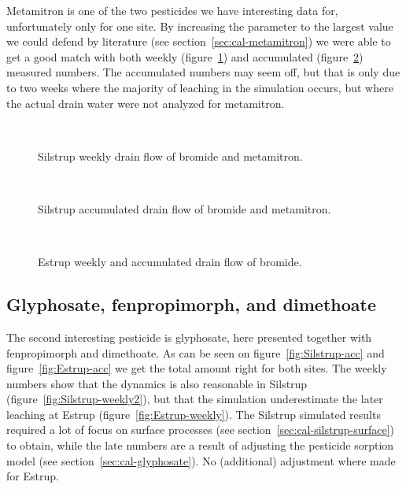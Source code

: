 Metamitron is one of the two pesticides we have interesting data for,
unfortunately only for one site.  By increasing the \kd{} parameter to
the largest value we could defend by literature (see
section~\ref{sec:cal-metamitron}) we were able to get a good match
with both weekly (figure~\ref{fig:Silstrup-weekly}) and accumulated
(figure~\ref{fig:Silstrup-bromide-acc}) measured numbers.  The
accumulated numbers may seem off, but that is only due to two weeks
where the majority of leaching in the simulation occurs, but where the
actual drain water were not analyzed for metamitron.

\begin{figure}[htbp]
  \begin{center}
    \\
  \end{center}
  \caption{Silstrup weekly drain flow of bromide and metamitron.}
  \label{fig:Silstrup-weekly}
\end{figure}

\begin{figure}[htbp]
  \begin{center}
    \\
  \end{center}
  \caption{Silstrup accumulated drain flow of bromide and metamitron.}
  \label{fig:Silstrup-bromide-acc}
\end{figure}

\begin{figure}[htbp]
  \begin{center}
    \\
  \end{center}
  \caption{Estrup weekly and accumulated drain flow of bromide.}
  \label{fig:Estrup-bromide-drain}
\end{figure}

\FloatBarrier
\subsection{Glyphosate,  fenpropimorph, and dimethoate}

The second interesting pesticide is glyphosate, here presented
together with fenpropimorph and dimethoate.  As can be seen on
figure~\ref{fig:Silstrup-acc} and figure~\ref{fig:Estrup-acc} we get
the total amount right for both sites.  The weekly numbers show that
the dynamics is also reasonable in Silstrup
(figure~\ref{fig:Silstrup-weekly2}), but that the simulation
underestimate the later leaching at Estrup
(figure~\ref{fig:Estrup-weekly}).  The Silstrup simulated results
required a lot of focus on surface processes (see
section~\ref{sec:cal-silstrup-surface}) to obtain, while the late
numbers are a result of adjusting the pesticide sorption model (see
section~\ref{sec:cal-glyphosate}).  No (additional) adjustment where
made for Estrup.

